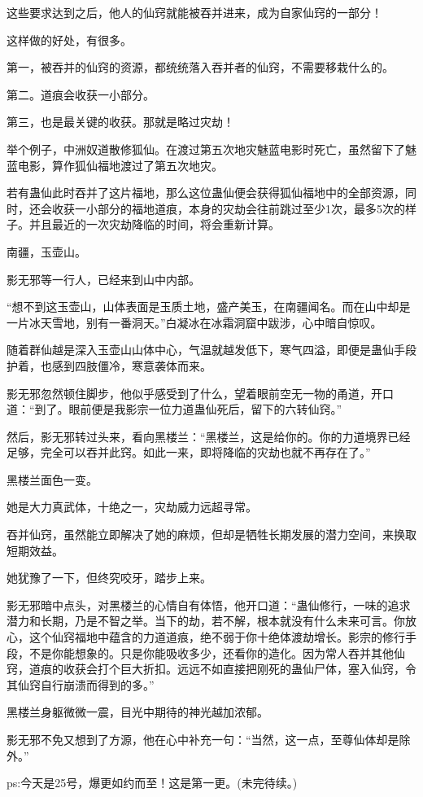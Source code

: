 \begin{this_body}
这些要求达到之后，他人的仙窍就能被吞并进来，成为自家仙窍的一部分！

这样做的好处，有很多。

第一，被吞并的仙窍的资源，都统统落入吞并者的仙窍，不需要移栽什么的。

第二。道痕会收获一小部分。

第三，也是最关键的收获。那就是略过灾劫！

举个例子，中洲奴道散修狐仙。在渡过第五次地灾魅蓝电影时死亡，虽然留下了魅蓝电影，算作狐仙福地渡过了第五次地灾。

若有蛊仙此时吞并了这片福地，那么这位蛊仙便会获得狐仙福地中的全部资源，同时，还会收获一小部分的福地道痕，本身的灾劫会往前跳过至少1次，最多5次的样子。并且最近的一次灾劫降临的时间，将会重新计算。

南疆，玉壶山。

影无邪等一行人，已经来到山中内部。

“想不到这玉壶山，山体表面是玉质土地，盛产美玉，在南疆闻名。而在山中却是一片冰天雪地，别有一番洞天。”白凝冰在冰霜洞窟中跋涉，心中暗自惊叹。

随着群仙越是深入玉壶山山体中心，气温就越发低下，寒气四溢，即便是蛊仙手段护着，也感到四肢僵冷，寒意袭体而来。

影无邪忽然顿住脚步，他似乎感受到了什么，望着眼前空无一物的甬道，开口道：“到了。眼前便是我影宗一位力道蛊仙死后，留下的六转仙窍。”

然后，影无邪转过头来，看向黑楼兰：“黑楼兰，这是给你的。你的力道境界已经足够，完全可以吞并此窍。如此一来，即将降临的灾劫也就不再存在了。”

黑楼兰面色一变。

她是大力真武体，十绝之一，灾劫威力远超寻常。

吞并仙窍，虽然能立即解决了她的麻烦，但却是牺牲长期发展的潜力空间，来换取短期效益。

她犹豫了一下，但终究咬牙，踏步上来。

影无邪暗中点头，对黑楼兰的心情自有体悟，他开口道：“蛊仙修行，一味的追求潜力和长期，乃是不智之举。当下的劫，若不解，根本就没有什么未来可言。你放心，这个仙窍福地中蕴含的力道道痕，绝不弱于你十绝体渡劫增长。影宗的修行手段，不是你能想象的。只是你能吸收多少，还看你的造化。因为常人吞并其他仙窍，道痕的收获会打个巨大折扣。远远不如直接把刚死的蛊仙尸体，塞入仙窍，令其仙窍自行崩溃而得到的多。”

黑楼兰身躯微微一震，目光中期待的神光越加浓郁。

影无邪不免又想到了方源，他在心中补充一句：“当然，这一点，至尊仙体却是除外。”

ps:今天是25号，爆更如约而至！这是第一更。(未完待续。)

\end{this_body}

